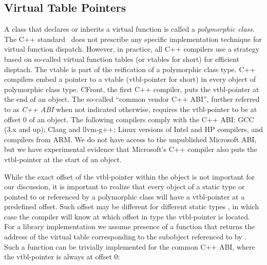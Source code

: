 \subsection{Virtual Table Pointers}
\label{sec:vtp}


A class that declares or inherits a virtual function is called a 
\emph{polymorphic class}. The C++ standard~\cite{C++11} does not prescribe any 
specific implementation technique for virtual function dispatch.
However, in practice, all C++ compilers use a strategy based on so-called
virtual function tables (or vtables for short) for efficient disptach. 
The vtable is part of the reification of a polymorphic class type.  
C++ compilers embed a pointer to a vtable (vtbl-pointer for short) in every object of
polymorphic class type. CFront, the first C++ compiler, puts the vtbl-pointer
at the end of an object. The so-called ``common vendor C++ ABI''\cite{C++ABI}, 
further referred to as \emph{C++ ABI} when not indicated otherwise, requires the 
vtbl-pointer to be at offset 0 of an object. The following compilers comply with 
the C++ ABI: GCC (3.x and up); Clang and llvm-g++; Linux versions of Intel and 
HP compilers, and compilers from ARM. %
We do not have access to the unpublished Microsoft ABI, but we have
experimental evidence that Microsoft's C++ compiler also puts the vtbl-pointer 
at the start of an object. 

While the exact offset of the vtbl-pointer within the object is not important 
for our discussion, it is important to realize that every object of a static 
type  or  pointed to or referenced by a polymorphic class 
 will have a vtbl-pointer at a predefined offset. Such offset may be 
different for different static types , in which case the compiler will 
know at which offset in type  the vtbl-pointer is located. 
For a library implementation we assume presence of a function 
that returns the address of the virtual table corresponding to the subobject 
referenced to by . Such a function can be trivially implemented for the 
common C++ ABI, where the vtbl-pointer is always at offset 0:

